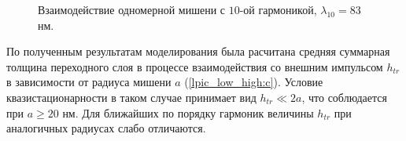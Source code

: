 
    \begin{figure}[htbp]
        \hfil
        \caption{Взаимодействие одномерной мишени с $10$-ой гармоникой, $\lambda_{10} = 83$ нм.}\label{lpic_low_high:image}
    \end{figure}

По полученным результатам моделирования была расчитана средняя суммарная толщина переходного слоя в процессе взаимодействия со внешним импульсом $h_{tr}$ в зависимости от радиуса мишени $a$ (\autoref{lpic_low_high:c}). Условие квазистационарности в таком случае принимает вид $h_{tr} \ll 2a$, что соблюдается при $a \geq 20$ нм. Для ближайших по порядку гармоник величины $h_{tr}$ при аналогичных радиусах слабо отличаются.
